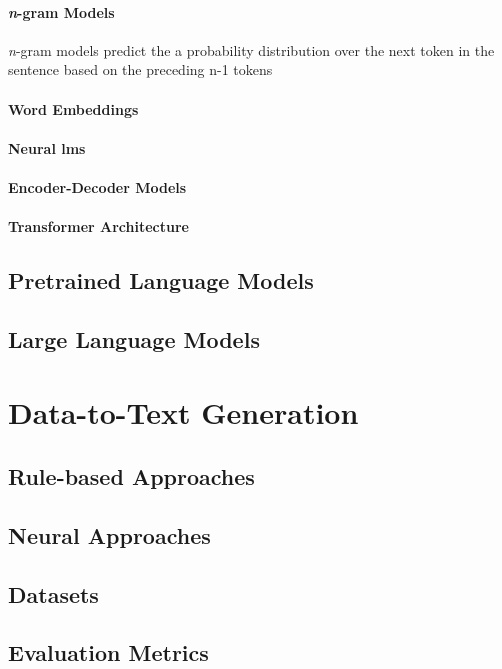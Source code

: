 \paragraph{\emph{n}-gram Models} \emph{n}-gram models predict the a probability distribution over the next token in the sentence
based on the preceding n-1 tokens

\paragraph{Word Embeddings}

\paragraph{Neural \acp{lm}}

\paragraph{Encoder-Decoder Models}

\paragraph{Transformer Architecture}
\subsection{Pretrained Language Models}
\label{sec:plms}
\subsection{Large Language Models}
\label{sec:llms}
\section{Data-to-Text Generation}
\label{sec:d2t}
\subsection{Rule-based Approaches}
\label{sec:rule-d2t}
\subsection{Neural Approaches}
\label{sec:neural-d2t}
\subsection{Datasets}
\label{sec:datasets}
\subsection{Evaluation Metrics}
\label{sec:evaluation}